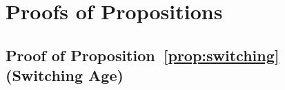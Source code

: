 \documentclass[11pt,a4paper]{article}
\theoremstyle{definition}
\begin{document}




\appendix

\section{Proofs of Propositions}
\label{app:proofs}

\subsection{Proof of Proposition~\ref{prop:switching} (Switching Age)}
\end{document}
